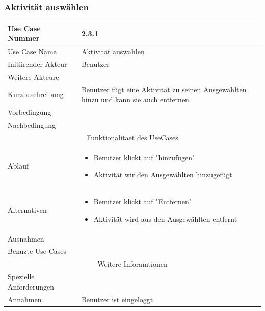 \documentclass[10pt,a4paper]{article}
\begin{document}
\subsubsection{Aktivit\"at ausw\"ahlen}
		\begin{tabular}{|l|p{.5\linewidth}|}
		\hline Use Case Nummer & 2.3.1 \\ 
		\hline Use Case Name & Aktivit\"at ausw\"ahlen \\ 
		\hline Initiirender Akteur & Benutzer \\
		\hline Weitere Akteure &  \\
		\hline Kurzbeschreibung & Benutzer f\"ugt eine Aktivit\"at zu seinen Ausgew\"ahlten hinzu und kann sie auch entfernen \\
		\hline Vorbedingung &  \\
		\hline Nachbedingung &  \\
		\hline \multicolumn{2}{|c|}{Funktionalitaet des UseCases}\\
		\hline Ablauf & \begin{itemize}
			\item Benutzer klickt auf "hinzuf\"ugen"
			\item Aktivit\"at wir den Ausgew\"ahlten hinzugef\"ugt
		\end{itemize} \\
		\hline Alternativen & \begin{itemize}
			\item Benutzer klickt auf "Entfernen"
			\item Aktivit\"at wird aus den Ausgew\"ahlten entfernt
		\end{itemize}  \\
		\hline Ausnahmen &  \\
		\hline Benuzte Use Cases &  \\
		\hline \multicolumn{2}{|c|}{Weitere Inforamtionen} \\
		\hline Spezielle Anforderungen &  \\
		\hline Annahmen & Benutzer ist eingeloggt \\
		\hline
		\end{tabular}
\end{document}
